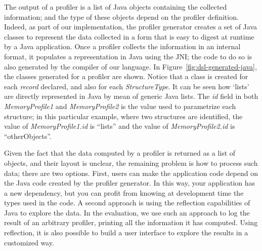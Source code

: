 The output of a profiler is a list of Java objects containing the collected information; and the type of these objects depend on the profiler definition.
Indeed, as part of our implementation, the profiler generator creates a set of Java classes to represent the data collected in a form that is easy to digest at runtime by a Java application.
Once a profiler collects the information in an internal format, it populates a representation in Java using the \gls{JNI}; the code to do so is also generated by the compiler of our language.
In Figure~\ref{fig:dsl-generated-java}, the classes generated for a profiler are shown.
Notice that a class is created for each \textit{record} declared, and also for each \textit{StructureType}.
It can be seen how `lists' are directly represented in Java by mean of generic Java lists.
The \textit{id} field in both \textit{MemoryProfile1} and \textit{MemoryProfile2} is the value used to parametrize each structure;
in this particular example, where two structures are identified, the value of \textit{MemoryProfile1.id} is ``lists'' and the value of \textit{MemoryProfile2.id} is ``otherObjects''.

Given the fact that the data computed by a profiler is returned as a list of objects, and their layout is unclear, the remaining problem is how to process such data; there are two options.
First, users can make the application code depend on the Java code created by the profiler generator.
In this way, your application has a new dependency, but you can profit from knowing at development time the types used in the code.
A second approach is using the reflection capabilities of Java to explore the data.
In the evaluation, we use such an approach to log the result of an arbitrary profiler, printing all the information it has computed.
Using reflection, it is also possible to build a user interface to explore the results in a customized way.  

